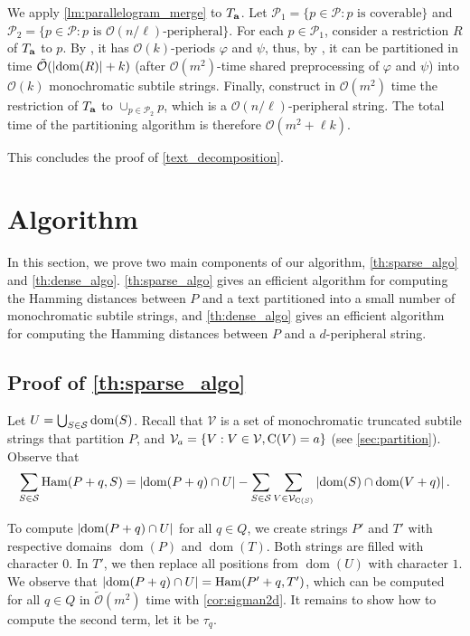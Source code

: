 \documentclass[twoside,leqno]{article}
\renewcommand{\O}{\mathcal{O}}
\newcommand{\tO}{\tilde{\mathcal{O}}}
\renewcommand{\S}{\mathcal{S}}
\newcommand{\V}{\mathcal{V}}
\renewcommand{\phi}{\varphi}
\newcommand{\set}[1]{\left\lbrace #1 \right\rbrace}
\DeclareMathOperator*{\Ham}{Ham}
\DeclareMathOperator*{\dom}{dom}
\newcommand{\absolute}[1]{\left\lvert#1\right\rvert}
\newcommand{\jonas}[2][]{\todo[color=green!40, #1]{\textbf{J:} #2}}
\begin{document}
We apply \cref{lm:parallelogram_merge} to $T_\mathbf{a}$. Let $\mathcal{P}_1 = \{p \in \mathcal{P} : p \text { is coverable}\}$ and $\mathcal{P}_2 = \{p \in \mathcal{P} : p \text { is }\O(n/\ell)\text{-peripheral}\}$. For each $p \in \mathcal{P}_1$, consider a restriction $R$ of $T_\mathbf{a}$ to $p$. By , it has $\O(k)$-periods $\phi$ and $\psi$, thus, by , it can be partitioned in time $\tO(\absolute{\d{R}} + k)$ (after $\O(m^2)$-time shared preprocessing of $\phi$ and $\psi$) into $\O(k)$ monochromatic subtile strings. Finally, construct in $\O(m^2)$ time the restriction of $T_\mathbf{a}$ to $\cup_{p \in \mathcal{P}_2} p$, which is a $\O(n / \ell)$-peripheral string. The total time of the partitioning algorithm is therefore $\O(m^2+\ell k)$.

This concludes the proof of \cref{text_decomposition}.

\section{Algorithm}
\label{sec:algorithm}
In this section, we prove two main components of our algorithm, \cref{th:sparse_algo} and \cref{th:dense_algo}. \cref{th:sparse_algo} gives an efficient algorithm for computing the Hamming distances between $P$ and a text partitioned into a small number of monochromatic subtile strings, and \cref{th:dense_algo} gives an efficient algorithm for computing the Hamming distances between $P$ and a $d$-peripheral string.

\subsection{Proof of \cref{th:sparse_algo}}
\restateThmSparseAlgo
Let $U = \bigcup_{S \in \S} \d{S}$. Recall that $\V$ is a set of monochromatic truncated subtile strings that partition $P$, and $\V_a = \set{V : V \in \V, \getchar{V} = a}$ (see \cref{sec:partition}\jonas{have to check this later}).
 Observe that
\begin{align}
\label{eq:sparse}
\sum_{S \in \S} \Ham(P + q, S) = \absolute{\d{P + q} \cap U} - \sum_{S \in \S}\sum_{V \in \V_{\getchar{S}}} \absolute{\d{S} \cap \d{V + q}}.
\end{align}

To compute $\absolute{\d{P + q} \cap U}$ for all $q \in Q$, we create strings $P'$ and $T'$ with respective domains $\dom(P)$ and $\dom(T)$. Both strings are filled with character $0$. 
In $T'$, we then replace all positions from $\dom(U)$ with character $1$. 
We observe that $\absolute{\d{P + q} \cap U} = \Ham(P' + q, T')$, which can be computed for all $q \in Q$ in $\tO(m^2)$ time with \cref{cor:sigman2d}.
It remains to show how to compute the second term, let it be $\tau_q$. 
\end{document}
